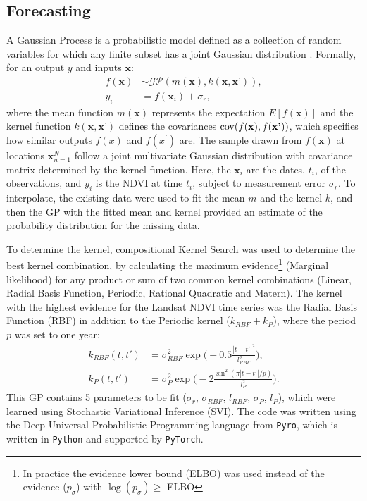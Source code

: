 \documentclass[review]{elsarticle}
\begin{document}
\subsection{Forecasting}\label{forecast_method}

A Gaussian Process is a probabilistic model defined as a collection of random variables for which any finite subset has a joint Gaussian distribution \citep{gpm}. Formally, for an output $y$ and inputs $\textbf{x}$:
\begin{align}
	f(\textbf{x}) &\sim \mathcal{GP}(m(\textbf{x}), k(\textbf{x},\textbf{x'})),\\
	y_i &= f(\textbf{x}_i) + \sigma_r,
\end{align}
where the mean function $m(\textbf{x})$ represents the expectation $E[f(\textbf{x})]$ and the kernel function $k(\textbf{x}, \textbf{x'})$ defines the covariances ${\rm cov}(f(\textbf{x}), f(\textbf{x'}))$, which specifies how similar outputs $f(x)$ and $f(x^\prime)$ are. The sample drawn from $f(\textbf{x})$ at locations ${\textbf{x}}_{n=1}^N$ follow a joint multivariate Gaussian distribution with covariance matrix determined by the kernel function. Here, the $\textbf{x}_i$ are the dates, $t_i$, of the observations, and $y_i$ is the NDVI at time $t_i$, subject to measurement error $\sigma_r$. To interpolate, the existing data were used to fit the mean $m$ and the kernel $k$, and then the GP with the fitted mean and kernel provided an estimate of the probability distribution for the missing data.

 To determine the kernel, compositional Kernel Search \citep{pmlr-v28-duvenaud13} was used to determine the best kernel combination, by calculating the maximum evidence\footnote{In practice the evidence lower bound (ELBO) was used instead of the evidence ($p_\sigma$) with $\log(p_\sigma) \ge$ ELBO} (Marginal likelihood) for any product or sum of two common kernel combinations (Linear,  Radial Basis Function, Periodic, Rational Quadratic and Matern). The kernel with the highest evidence for the Landsat NDVI time series was the Radial Basis Function (RBF) in addition to the Periodic kernel ($k_{RBF}+k_P $), where the period $p$ was set to one year:
\begin{align}
	k_{RBF}(t,t') &= \sigma_{RBF}^2 \exp{\Big( -0.5 \frac{|t-t'|^2}{l_{RBF}^2} \Big) }, \label{eq:eqr} \\
	k_P(t,t') &=    \sigma_{P}^2 \exp{\Big(-2 \frac{\sin^2(\pi |t-t'|/p)}{l_{P}^2}\Big)}. \label{eq:eqP}
\end{align}
This GP contains 5 parameters to be fit ($\sigma_r$, $\sigma_{RBF}$, $l_{RBF}$, $\sigma_{P}$, $l_{P}$), which were learned using Stochastic Variational Inference (SVI). The code was written using the Deep Universal Probabilistic Programming language from \texttt{Pyro}, which is written in \texttt{Python} and supported by \texttt{PyTorch}.
\end{document}
